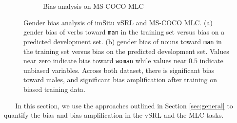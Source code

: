 \begin{figure}[t]
\begin{subfigure}[b]{0.48\textwidth}
        \caption{Bias analysis on MS-COCO MLC}
        \label{fig:gen_dev_coco}
    \end{subfigure}
    \caption{Gender bias analysis of imSitu vSRL and MS-COCO MLC. (a) gender bias of verbs toward \texttt{man} in the training set versus bias on a predicted development set. (b) gender bias of nouns toward \texttt{man} in the training set versus bias on the predicted development set. Values near zero indicate bias toward \texttt{woman} while values near $0.5$ indicate unbiased variables. Across both dataset, there is significant bias toward males, and significant bias amplification after training on biased training data.}
    \label{fig:imSitu_results}
\end{figure}

    ~ %
    ~ %
In this section, we use the approaches outlined in Section \ref{sec:general} to quantify the bias and bias amplification in the vSRL and the MLC tasks.
